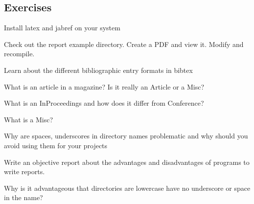 \subsection{Exercises} \bigskip


\begin{exercise}
\label{E:Report.1}
Install latex and jabref on your system
\end{exercise}

\begin{exercise}
\label{E:Report.2}
Check out the report example directory. Create a PDF and view it. Modify
and recompile.
\end{exercise}

\begin{exercise}
\label{E:Report.4}
Learn about the different bibliographic entry formats in bibtex
\end{exercise}

\begin{exercise}
\label{E:Report.5}
What is an article in a magazine? Is it really an Article or a Misc?
\end{exercise}

\begin{exercise}
\label{E:Report.6}
What is an InProceedings and how does it differ from Conference?
\end{exercise}

\begin{exercise}
\label{E:Report.7}
What is a Misc?
\end{exercise}

\begin{exercise}
\label{E:Report.8}
Why are spaces, underscores in directory names problematic and why should you avoid using them for your projects
\end{exercise}

\begin{exercise}
\label{E:Report.9}
Write an objective report about the advantages and disadvantages of programs to write reports.
\end{exercise}

\begin{exercise} 
\label{E:Report.10}
Why is it advantageous that directories are lowercase have no underscore or space in the name?
\end{exercise}


